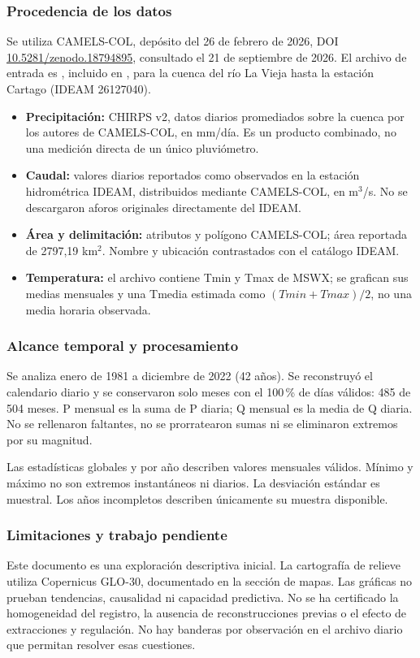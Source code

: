 \documentclass[10pt,a4paper]{article}
\begin{document}
\subsubsection*{Procedencia de los datos}
Se utiliza CAMELS-COL, depósito del 26 de febrero de 2026, DOI
\href{https://doi.org/10.5281/zenodo.18794895}{10.5281/zenodo.18794895}, consultado
el 21 de septiembre de 2026. El archivo de entrada es
, incluido en
, para la cuenca del río
La Vieja hasta la estación Cartago (IDEAM 26127040).
\begin{itemize}
\item \textbf{Precipitación:} CHIRPS v2, datos diarios promediados sobre la cuenca
por los autores de CAMELS-COL, en mm/día. Es un producto combinado, no una
medición directa de un único pluviómetro.
\item \textbf{Caudal:} valores diarios reportados como observados en la estación
hidrométrica IDEAM, distribuidos mediante CAMELS-COL, en m$^3$/s. No se
descargaron aforos originales directamente del IDEAM.
\item \textbf{Área y delimitación:} atributos y polígono CAMELS-COL; área
reportada de 2797,19 km$^2$. Nombre y ubicación contrastados con el catálogo IDEAM.
\item \textbf{Temperatura:} el archivo contiene Tmin y Tmax de MSWX; se grafican sus medias mensuales y una Tmedia estimada como $(Tmin+Tmax)/2$, no una media horaria observada.
\end{itemize}

\subsubsection*{Alcance temporal y procesamiento}
Se analiza enero de 1981 a diciembre de 2022 (42 años). Se reconstruyó el
calendario diario y se conservaron solo meses con el 100\,\% de días válidos:
485 de 504 meses. P mensual es la suma de P diaria; Q mensual es la media de Q
diaria. No se rellenaron faltantes, no se prorratearon sumas ni se eliminaron
extremos por su magnitud.

Las estadísticas globales y por año describen valores mensuales válidos. Mínimo
y máximo no son extremos instantáneos ni diarios. La desviación estándar es
muestral. Los años incompletos describen únicamente su muestra disponible.

\subsubsection*{Limitaciones y trabajo pendiente}
Este documento es una exploración descriptiva inicial. La cartografía de relieve utiliza Copernicus GLO-30, documentado en la sección de mapas. Las gráficas no prueban
tendencias, causalidad ni capacidad predictiva. No se ha certificado la
homogeneidad del registro, la ausencia de reconstrucciones previas o el efecto de
extracciones y regulación. No hay banderas por observación en el archivo diario
que permitan resolver esas cuestiones.
\end{document}
